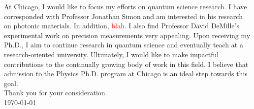 \documentclass[12pt]{article}
\begin{document}
At Chicago, I would like to focus my efforts on quantum science research. I have corresponded with Professor Jonathan Simon and am interested in his research on photonic materials. In addition, \textcolor{red}{blah}. I also find Professor David DeMille's experimental work on precision measurements very appealing. Upon receiving my Ph.D., I aim to continue research in quantum science and eventually teach at a research-oriented university. Ultimately, I would like to make impactful contributions to the continually growing body of work in this field. I believe that admission to the Physics Ph.D. program at Chicago is an ideal step towards this goal. \\

\noindent Thank you for your consideration. \\

\noindent \today
	











	
	
	
	
	
\end{document}
